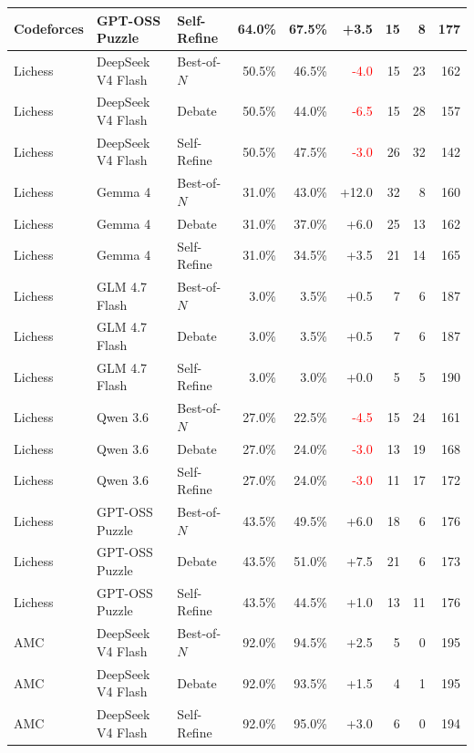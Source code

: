 \begin{table}[H]
{\begin{tabular}{@{}lllrrrrrr@{}}
Codeforces & GPT-OSS Puzzle & Self-Refine & 64.0\% & 67.5\% & \textcolor{green!50!black}{+3.5} & 15 & 8 & 177 \\
\midrule
Lichess & DeepSeek V4 Flash & Best-of-$N$ & 50.5\% & 46.5\% & \textcolor{red}{-4.0} & 15 & 23 & 162 \\
Lichess & DeepSeek V4 Flash & Debate & 50.5\% & 44.0\% & \textcolor{red}{-6.5} & 15 & 28 & 157 \\
Lichess & DeepSeek V4 Flash & Self-Refine & 50.5\% & 47.5\% & \textcolor{red}{-3.0} & 26 & 32 & 142 \\
Lichess & Gemma 4 & Best-of-$N$ & 31.0\% & 43.0\% & \textcolor{green!50!black}{+12.0} & 32 & 8 & 160 \\
Lichess & Gemma 4 & Debate & 31.0\% & 37.0\% & \textcolor{green!50!black}{+6.0} & 25 & 13 & 162 \\
Lichess & Gemma 4 & Self-Refine & 31.0\% & 34.5\% & \textcolor{green!50!black}{+3.5} & 21 & 14 & 165 \\
Lichess & GLM 4.7 Flash & Best-of-$N$ & 3.0\% & 3.5\% & \textcolor{green!50!black}{+0.5} & 7 & 6 & 187 \\
Lichess & GLM 4.7 Flash & Debate & 3.0\% & 3.5\% & \textcolor{green!50!black}{+0.5} & 7 & 6 & 187 \\
Lichess & GLM 4.7 Flash & Self-Refine & 3.0\% & 3.0\% & +0.0 & 5 & 5 & 190 \\
Lichess & Qwen 3.6 & Best-of-$N$ & 27.0\% & 22.5\% & \textcolor{red}{-4.5} & 15 & 24 & 161 \\
Lichess & Qwen 3.6 & Debate & 27.0\% & 24.0\% & \textcolor{red}{-3.0} & 13 & 19 & 168 \\
Lichess & Qwen 3.6 & Self-Refine & 27.0\% & 24.0\% & \textcolor{red}{-3.0} & 11 & 17 & 172 \\
Lichess & GPT-OSS Puzzle & Best-of-$N$ & 43.5\% & 49.5\% & \textcolor{green!50!black}{+6.0} & 18 & 6 & 176 \\
Lichess & GPT-OSS Puzzle & Debate & 43.5\% & 51.0\% & \textcolor{green!50!black}{+7.5} & 21 & 6 & 173 \\
Lichess & GPT-OSS Puzzle & Self-Refine & 43.5\% & 44.5\% & \textcolor{green!50!black}{+1.0} & 13 & 11 & 176 \\
\midrule
AMC & DeepSeek V4 Flash & Best-of-$N$ & 92.0\% & 94.5\% & \textcolor{green!50!black}{+2.5} & 5 & 0 & 195 \\
AMC & DeepSeek V4 Flash & Debate & 92.0\% & 93.5\% & \textcolor{green!50!black}{+1.5} & 4 & 1 & 195 \\
AMC & DeepSeek V4 Flash & Self-Refine & 92.0\% & 95.0\% & \textcolor{green!50!black}{+3.0} & 6 & 0 & 194 \\

\end{tabular}}
\end{table}

